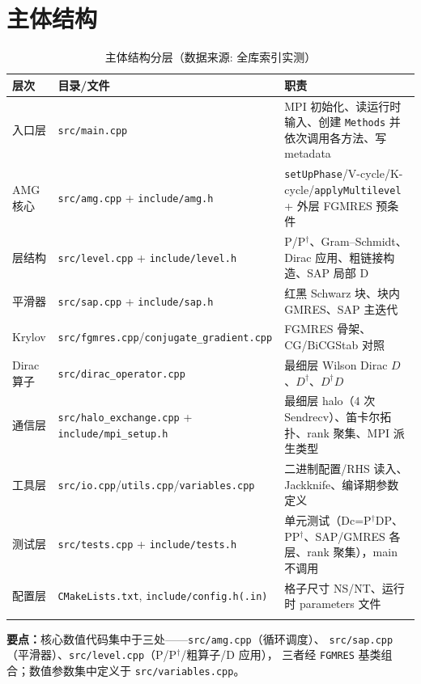 \documentclass[UTF8]{ctexart}
\begin{document}
\section{主体结构}
\begin{xltabular}{\textwidth}{lXX}
\toprule
\textcolor{struct}{层次} & 目录/文件 & \textcolor{struct}{职责} \\
\midrule
\endhead
入口层 & \texttt{\nolinkurl{src/main.cpp}} & MPI 初始化、读运行时输入、创建 \texttt{Methods} 并依次调用各方法、写 metadata \\
AMG 核心 & \texttt{\nolinkurl{src/amg.cpp}} + \texttt{\nolinkurl{include/amg.h}} & \texttt{setUpPhase}/V-cycle/K-cycle/\texttt{applyMultilevel} + 外层 FGMRES 预条件 \\
层结构 & \texttt{\nolinkurl{src/level.cpp}} + \texttt{\nolinkurl{include/level.h}} & P/P$^\dagger$、Gram--Schmidt、Dirac 应用、粗链接构造、SAP 局部 D \\
平滑器 & \texttt{\nolinkurl{src/sap.cpp}} + \texttt{\nolinkurl{include/sap.h}} & 红黑 Schwarz 块、块内 GMRES、SAP 主迭代 \\
Krylov & \texttt{\nolinkurl{src/fgmres.cpp}}/\texttt{\nolinkurl{conjugate_gradient.cpp}} & FGMRES 骨架、CG/BiCGStab 对照 \\
Dirac 算子 & \texttt{src/dirac\_operator.cpp} & 最细层 Wilson Dirac $D$、$D^\dagger$、$D^\dagger D$ \\
通信层 & \texttt{\nolinkurl{src/halo_exchange.cpp}} + \texttt{\nolinkurl{include/mpi_setup.h}} & 最细层 halo（4 次 Sendrecv）、笛卡尔拓扑、rank 聚集、MPI 派生类型 \\
工具层 & \texttt{\nolinkurl{src/io.cpp}}/\texttt{utils.cpp}/\texttt{variables.cpp} & 二进制配置/RHS 读入、Jackknife、编译期参数定义 \\
测试层 & \texttt{\nolinkurl{src/tests.cpp}} + \texttt{\nolinkurl{include/tests.h}} & 单元测试（Dc=P$^\dagger$DP、PP$^\dagger$、SAP/GMRES 各层、rank 聚集），main 不调用 \\
配置层 & \texttt{CMakeLists.txt}, \texttt{include/config.h(.in)} & 格子尺寸 NS/NT、运行时 parameters 文件 \\
\bottomrule
\caption{主体结构分层（数据来源: 全库索引实测）}
\end{xltabular}

\begin{keybox}
\textbf{要点：}核心数值代码集中于三处——\texttt{\nolinkurl{src/amg.cpp}}（循环调度）、
\texttt{\nolinkurl{src/sap.cpp}}（平滑器）、\texttt{\nolinkurl{src/level.cpp}}（P/P$^\dagger$/粗算子/D 应用），
三者经 \texttt{FGMRES} 基类组合；数值参数集中定义于 \texttt{\nolinkurl{src/variables.cpp}}。
\end{keybox}
\end{document}
